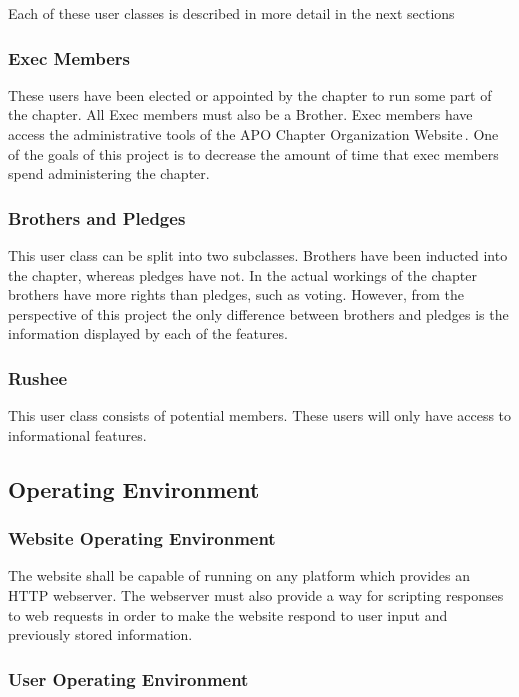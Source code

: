 \documentclass{article}
\newcommand{\projName}{APO Chapter Organization Website}
\begin{document}
Each of these user classes is described in more detail in the next sections

\subsubsection{Exec Members}

These users have been elected or appointed by the chapter to run some
part of the chapter. All Exec members must also be a Brother. Exec
members have access the administrative tools of the \projName \,. One
of the goals of this project is to decrease the amount of time that
exec members spend administering the chapter.

\subsubsection{Brothers and Pledges}

This user class can be split into two subclasses. Brothers have been
inducted into the chapter, whereas pledges have not. In the actual
workings of the chapter brothers have more rights than pledges, such
as voting. However, from the perspective of this project the only
difference between brothers and pledges is the information displayed
by each of the features.

\subsubsection{Rushee}

This user class consists of potential members. These users will only
have access to informational features.

\subsection{Operating Environment}

\subsubsection{Website Operating Environment}

The website shall be capable of running on any platform which provides
an HTTP webserver. The webserver must also provide a way for scripting
responses to web requests in order to make the website respond to user
input and previously stored information.

\subsubsection{User Operating Environment}
\end{document}
